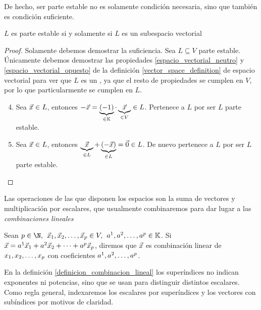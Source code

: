 \documentclass[../algebra_lineal.tex]{subfiles}
\begin{document}
De hecho, ser parte estable no es solamente condición necesaria, sino que también es condición suficiente.

\begin{proposition}
    $L$ es parte estable si y solamente si $L$ es un subespacio vectorial
\end{proposition}

\begin{proof}
    Solamente debemos demostrar la suficiencia. Sea $L \subseteq V$ parte estable. Únicamente debemos demostrar las propiedades \ref{espacio_vectorial_neutro} y \ref{espacio_vectorial_opuesto} de la definición \ref{vector_space_definition} de espacio vectorial para ver que $L$ es un \kvspace, ya que el resto de propiedades se cumplen en $V$, por lo que particularmente se cumplen en $L$.
    
    \begin{enumerate}
        \setcounter{enumi}{3}
        \item Sea $\vec{x} \in L$, entonces $-\vec{x} = \underbrace{(-1)}_{\in \mathbb{K}} \cdot \underbrace{\vec{x}}_{\in V} \in L$. Pertenece a $L$ por ser $L$ parte estable.
        \setcounter{enumi}{2}
        \item Sea $\vec{x} \in L$, entonces $\underbrace{\vec{x}}_{\in L} + \underbrace{(-\vec{x})}_{\in L} = \vec{0} \in L$. De nuevo pertenece a $L$ por ser $L$ parte estable.
    \end{enumerate}
    $ $
\end{proof}

Las operaciones de las que disponen los espacios son la suma de vectores y multiplicación por escalares, que usualmente combinaremos para dar lugar a las \textit{combinaciones lineales}

\begin{definition}
    \label{definicion_combinacion_lineal}
    Sean $p \in \N, \spc \dlst{\vx}{p} \in V, \spc \ulst{a}{p} \in \K$. Si $\vec{x} = {a}^{1}\vec{x}_{1}+{a}^{2}\vec{x}_{2}+\dots+{a}^{p}\vec{x}_{p}$, diremos que $\vec{x}$ es combinación linear de ${x}_{1}, {x}_{2}, \dots, {x}_{p}$ con coeficientes ${a}^{1}, {a}^{2}, \dots, {a}^{p}$.

\end{definition}

\begin{remark}
    En la definición \ref{definicion_combinacion_lineal} los superíndices no indican exponentes ni potencias, sino que se usan para distinguir distintos escalares. Como regla general, indexaremos los escalares por superíndices y los vectores con subíndices por motivos de claridad.
\end{remark}
\end{document}
